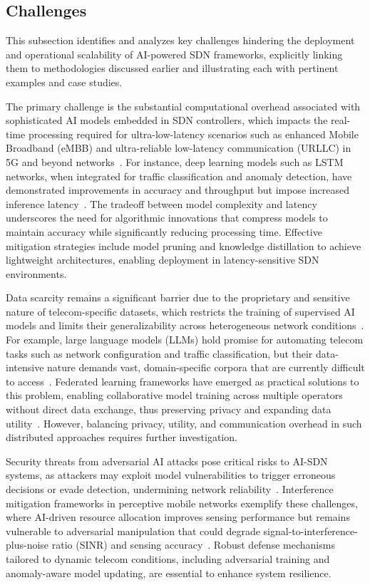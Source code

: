 \documentclass[sigconf]{acmart}
\begin{document}
\subsection{Challenges}

This subsection identifies and analyzes key challenges hindering the deployment and operational scalability of AI-powered SDN frameworks, explicitly linking them to methodologies discussed earlier and illustrating each with pertinent examples and case studies.

The primary challenge is the substantial computational overhead associated with sophisticated AI models embedded in SDN controllers, which impacts the real-time processing required for ultra-low-latency scenarios such as enhanced Mobile Broadband (eMBB) and ultra-reliable low-latency communication (URLLC) in 5G and beyond networks~\cite{ref52}. For instance, deep learning models such as LSTM networks, when integrated for traffic classification and anomaly detection, have demonstrated improvements in accuracy and throughput but impose increased inference latency~\cite{ref52}. The tradeoff between model complexity and latency underscores the need for algorithmic innovations that compress models to maintain accuracy while significantly reducing processing time. Effective mitigation strategies include model pruning and knowledge distillation to achieve lightweight architectures, enabling deployment in latency-sensitive SDN environments.

Data scarcity remains a significant barrier due to the proprietary and sensitive nature of telecom-specific datasets, which restricts the training of supervised AI models and limits their generalizability across heterogeneous network conditions~\cite{ref7}. For example, large language models (LLMs) hold promise for automating telecom tasks such as network configuration and traffic classification, but their data-intensive nature demands vast, domain-specific corpora that are currently difficult to access~\cite{ref7}. Federated learning frameworks have emerged as practical solutions to this problem, enabling collaborative model training across multiple operators without direct data exchange, thus preserving privacy and expanding data utility~\cite{ref7}. However, balancing privacy, utility, and communication overhead in such distributed approaches requires further investigation.

Security threats from adversarial AI attacks pose critical risks to AI-SDN systems, as attackers may exploit model vulnerabilities to trigger erroneous decisions or evade detection, undermining network reliability~\cite{ref48}. Interference mitigation frameworks in perceptive mobile networks exemplify these challenges, where AI-driven resource allocation improves sensing performance but remains vulnerable to adversarial manipulation that could degrade signal-to-interference-plus-noise ratio (SINR) and sensing accuracy~\cite{ref48}. Robust defense mechanisms tailored to dynamic telecom conditions, including adversarial training and anomaly-aware model updating, are essential to enhance system resilience.
\end{document}
